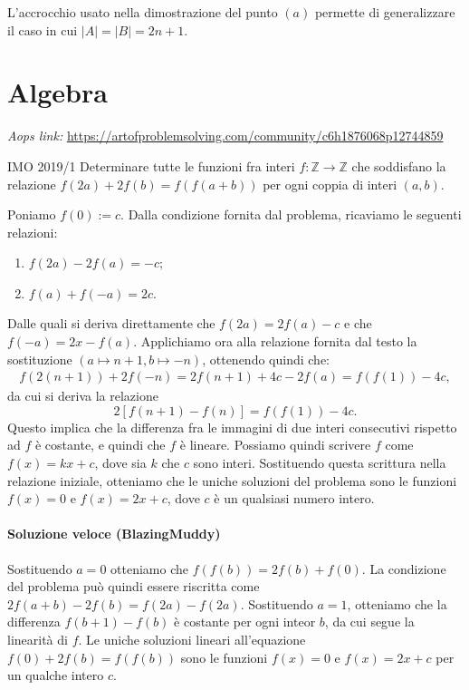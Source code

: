 \documentclass{article}
\begin{document}
\begin{remark*}{}{}
	L'accrocchio usato nella dimostrazione del punto $(a)$ permette
	di generalizzare il caso in cui $\vert A \vert=\vert B\vert=2n+1$.
\end{remark*}

\newpage

\section{Algebra}

\textit{Aops link:}
\href{https://artofproblemsolving.com/community/c6h1876068p12744859}
{https://artofproblemsolving.com/community/c6h1876068p12744859}

\begin{proposition}{IMO 2019/1}{}
	Determinare tutte le funzioni fra interi
	$f:\mathbb{Z}\rightarrow \mathbb{Z}$
	che soddisfano la relazione $f(2a)+2f(b)=f(f(a+b))$ per ogni coppia
	di interi $(a,b)$.
\end{proposition}

Poniamo $f(0):=c$.
Dalla condizione fornita dal problema, ricaviamo le seguenti relazioni:
\begin{enumerate}
	\item $f(2a)-2f(a)=-c$;
	\item $f(a)+f(-a)=2c$.
\end{enumerate}

Dalle quali si deriva direttamente che $f(2a)=2f(a)-c$ e che
$f(-a)=2x-f(a)$. Applichiamo ora alla relazione fornita dal
testo la sostituzione $(a\mapsto n+1,b\mapsto -n)$, ottenendo quindi che:
\begin{align*}
	f(2(n+1))+2f(-n)=2f(n+1)+4c-2f(a)
						 =f(f(1))-4c,
\end{align*}
da cui si deriva la relazione
\begin{equation*}
	2[f(n+1)-f(n)]=f(f(1))-4c.
\end{equation*}
Questo implica che la differenza fra le immagini di due interi
consecutivi rispetto ad $f$ è costante, e quindi che $f$ è lineare.
Possiamo quindi scrivere $f$ come $f(x)=kx+c$, dove sia $k$ che $c$
sono interi. Sostituendo questa scrittura nella relazione iniziale, 
otteniamo che le uniche soluzioni del problema sono le funzioni
$f(x)=0$ e $f(x)=2x+c$, dove $c$ è un qualsiasi numero intero.

\paragraph{Soluzione veloce (BlazingMuddy)}
Sostituendo $a=0$ otteniamo che $f(f(b))=2f(b)+f(0)$.
La condizione del problema può quindi essere riscritta come
$2f(a+b)-2f(b)=f(2a)-f(2a)$. Sostituendo $a=1$, otteniamo che
la differenza $f(b+1)-f(b)$ è costante per ogni inteor $b$, da
cui segue la linearità di $f$. Le uniche soluzioni
lineari all'equazione $f(0)+2f(b)=f(f(b))$ sono le funzioni
$f(x)=0$ e $f(x)=2x+c$ per un qualche intero $c$.
\end{document}
